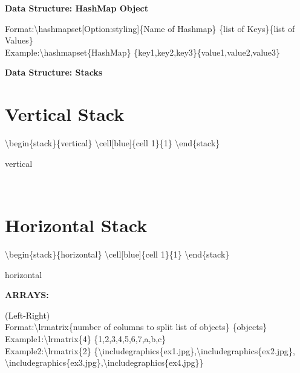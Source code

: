 \documentclass{article}
\begin{document}
\newpage
\begin{center}
\textbf{{\Large Data Structure: HashMap Object}}
\end{center}
Format:{\textbackslash}hashmapset[Option:styling]{\{}Name of Hashmap{\} }{\{}list of Keys{\}}{\{}list of Values{\}}\\
Example:{\textbackslash}hashmapset{\{}HashMap{\} }{\{}key1,key2,key3{\}}{\{}value1,value2,value3{\}}\newline \\
\begin{adjustbox}{width=0.5\paperwidth,center,keepaspectratio}
\end{adjustbox}

\newpage
\begin{center}
\textbf{{\Large Data Structure: Stacks}}
\end{center}

\section*{Vertical Stack}
{\textbackslash}begin{\{}stack{\}}{\{}vertical{\}}
  {\textbackslash}cell[blue]{\{}cell 1{\}}{\{}1{\}}
{\textbackslash}end{\{}stack{\}} \\ \newline
\begin{stack}{vertical}
\end{stack}\\ \newline

\section*{Horizontal Stack}
{\textbackslash}begin{\{}stack{\}}{\{}horizontal{\}}
  {\textbackslash}cell[blue]{\{}cell 1{\}}{\{}1{\}}
{\textbackslash}end{\{}stack{\}} \\ \newline
\begin{stack}{horizontal}
\end{stack}

\newpage
\begin{center}
\textbf{{\Large ARRAYS:}}
\end{center}
(Left-Right)\\ 
Format:{\textbackslash}lrmatrix{\{}number of columns to split list of objects{\} }{\{}objects{\}}\\
Example1:{\textbackslash}lrmatrix{\{}4{\} }{\{}1,2,3,4,5,6,7,a,b,c{\}}\\
Example2:{\textbackslash}lrmatrix{\{}2{\} }{\{}{\textbackslash}includegraphics{\{}ex1.jpg{\}},{\textbackslash}includegraphics{\{}ex2.jpg{\}},\\{\textbackslash}includegraphics{\{}ex3.jpg{\}},{\textbackslash}includegraphics{\{}ex4.jpg{\}}{\}}\newline \\
\end{document}
